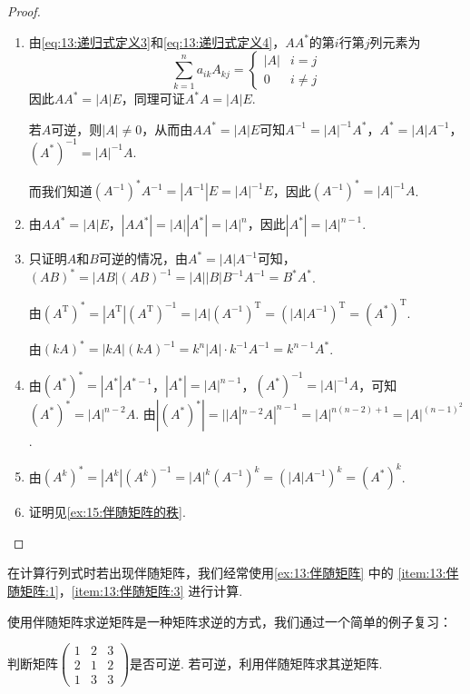 \begin{proof}
    \begin{enumerate}
        \item 由\autoref{eq:13:递归式定义3}和\autoref{eq:13:递归式定义4}，$AA^*$的第$i$行第$j$列元素为
        \[\sum_{k=1}^{n}a_{ik}A_{kj}=\begin{cases}
                |A| & i=j     \\
                0   & i \neq j
            \end{cases}\]
        因此$AA^*=|A|E$，同理可证$A^*A=|A|E$.

        若$A$可逆，则$|A| \neq 0$，从而由$AA^*=|A|E$可知$A^{-1}=|A|^{-1}A^*$，$A^*=|A|A^{-1}$，$(A^*)^{-1}=|A|^{-1}A$.

        而我们知道$(A^{-1})^*A^{-1}=|A^{-1}|E=|A|^{-1}E$，因此$(A^{-1})^*=|A|^{-1}A$.

        \item 由$AA^*=|A|E$，$|AA^*|=|A||A^*|=|A|^n$，因此$|A^*|=|A|^{n-1}$.

        \item 只证明$A$和$B$可逆的情况，由$A^*=|A|A^{-1}$可知，$(AB)^*=|AB|(AB)^{-1}=|A||B|B^{-1}A^{-1}=B^*A^*$.

        由$(A^\mathrm{T})^*=|A^\mathrm{T}|(A^\mathrm{T})^{-1}=|A|(A^{-1})^\mathrm{T}=(|A|A^{-1})^\mathrm{T}=(A^*)^\mathrm{T}$.

        由$(kA)^*=|kA|(kA)^{-1}=k^n|A|\cdot k^{-1}A^{-1}=k^{n-1}A^*$.

        \item 由$(A^*)^*=|A^*|A^{*-1}$，$|A^*|=|A|^{n-1}$，$(A^*)^{-1}=|A|^{-1}A$，可知$(A^*)^*=|A|^{n-2}A$. 由$|(A^*)^*|=||A|^{n-2}A|^{n-1}=|A|^{n(n-2)+1}=|A|^{(n-1)^2}$.

        \item 由$(A^k)^*=|A^k|(A^k)^{-1}=|A|^k(A^{-1})^k=(|A|A^{-1})^k=(A^*)^k$.

        \item 证明见\autoref{ex:15:伴随矩阵的秩}.
    \end{enumerate}
\end{proof}

在计算行列式时若出现伴随矩阵，我们经常使用\autoref{ex:13:伴随矩阵} 中的 \ref*{item:13:伴随矩阵:1}，\ref*{item:13:伴随矩阵:3} 进行计算.

使用伴随矩阵求逆矩阵是一种矩阵求逆的方式，我们通过一个简单的例子复习：
\begin{example}
    判断矩阵$\begin{pmatrix}
            1 & 2 & 3 \\ 2 & 1 & 2 \\ 1 & 3 & 3
        \end{pmatrix}$是否可逆. 若可逆，利用伴随矩阵求其逆矩阵.
\end{example}

